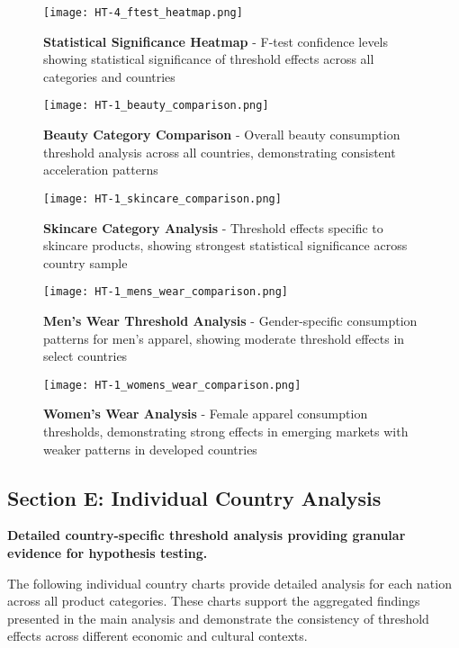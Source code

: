 \documentclass[11pt]{article}
\begin{document}
\begin{figure}[H]
\centering
\texttt{[image: HT-4\_ftest\_heatmap.png]}
\caption{\textbf{Statistical Significance Heatmap} - F-test confidence levels showing statistical significance of threshold effects across all categories and countries}
\end{figure}

\begin{figure}[H]
\centering
\texttt{[image: HT-1\_beauty\_comparison.png]}
\caption{\textbf{Beauty Category Comparison} - Overall beauty consumption threshold analysis across all countries, demonstrating consistent acceleration patterns}
\end{figure}

\begin{figure}[H]
\centering
\texttt{[image: HT-1\_skincare\_comparison.png]}
\caption{\textbf{Skincare Category Analysis} - Threshold effects specific to skincare products, showing strongest statistical significance across country sample}
\end{figure}

\begin{figure}[H]
\centering
\texttt{[image: HT-1\_mens\_wear\_comparison.png]}
\caption{\textbf{Men's Wear Threshold Analysis} - Gender-specific consumption patterns for men's apparel, showing moderate threshold effects in select countries}
\end{figure}

\begin{figure}[H]
\centering
\texttt{[image: HT-1\_womens\_wear\_comparison.png]}
\caption{\textbf{Women's Wear Analysis} - Female apparel consumption thresholds, demonstrating strong effects in emerging markets with weaker patterns in developed countries}
\end{figure}


\subsection*{Section E: Individual Country Analysis}

\textbf{Detailed country-specific threshold analysis providing granular evidence for hypothesis testing.}

The following individual country charts provide detailed analysis for each nation across all product categories. These charts support the aggregated findings presented in the main analysis and demonstrate the consistency of threshold effects across different economic and cultural contexts.
\end{document}
